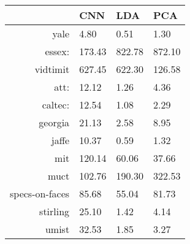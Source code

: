\begin{tabular}{|r|l|l|l|}
  \hline
    & CNN & LDA & PCA \\
  \hline
  yale & 4.80 & 0.51 & 1.30 \\
  \hline
  essex: & 173.43 & 822.78 & 872.10 \\
  \hline
  vidtimit & 627.45 & 622.30 & 126.58 \\
  \hline
  att: & 12.12 & 1.26 & 4.36 \\
  \hline
  caltec: & 12.54 & 1.08 & 2.29 \\
  \hline
  georgia & 21.13 & 2.58 & 8.95 \\
  \hline
  jaffe & 10.37 & 0.59 & 1.32 \\
  \hline
  mit & 120.14 & 60.06 & 37.66 \\
  \hline
  muct & 102.76 & 190.30 & 322.53 \\
  \hline
  specs-on-faces & 85.68 & 55.04 & 81.73 \\
  \hline
  stirling & 25.10 & 1.42 & 4.14 \\
  \hline
  umist & 32.53 & 1.85 & 3.27 \\
  \hline
\end{tabular}

